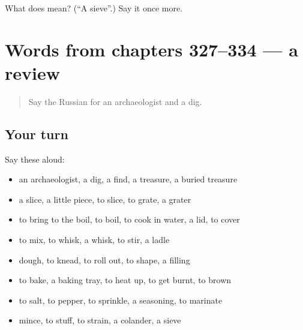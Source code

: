 \begin{tcolorbox}[breakable,colback=teal!4,colframe=teal!35!black,title={Before you move on}]
What does  mean? (\textquotedblleft{}A sieve\textquotedblright{}.) Say it once more.
\end{tcolorbox}
\section[(dialogue)]{Words from chapters 327–334 — a review}

\label{lesson:RU-R334-review-327-334}



\begin{quote}
Say the Russian for an archaeologist and a dig.
\end{quote}

\subsection*{Your turn}
Say these aloud:

\begin{itemize}
\raggedright
  \item an archaeologist, a dig, a find, a treasure, a buried treasure
  \item a slice, a little piece, to slice, to grate, a grater
  \item to bring to the boil, to boil, to cook in water, a lid, to cover
  \item to mix, to whisk, a whisk, to stir, a ladle
  \item dough, to knead, to roll out, to shape, a filling
  \item to bake, a baking tray, to heat up, to get burnt, to brown
  \item to salt, to pepper, to sprinkle, a seasoning, to marinate
  \item mince, to stuff, to strain, a colander, a sieve
\end{itemize}

